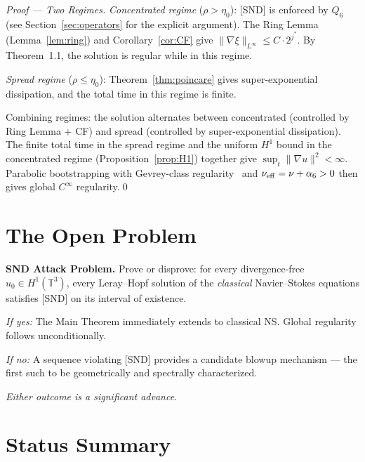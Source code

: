 \documentclass[11pt]{article}
\begin{document}
\begin{proof}[Proof --- Two Regimes]
\textit{Concentrated regime} ($\rho > \eta_0$): [SND] is enforced by $Q_6$
(see Section~\ref{sec:operators} for the explicit argument). The Ring Lemma
(Lemma~\ref{lem:ring}) and Corollary~\ref{cor:CF} give $\|\nabla\xi\|_{L^\infty} \leq C\cdot 2^{j^*}$.
By~\cite{CF1993} Theorem~1.1, the solution is regular while in this regime.

\textit{Spread regime} ($\rho \leq \eta_0$): Theorem~\ref{thm:poincare} gives
super-exponential dissipation, and the total time in this regime is finite.

Combining regimes: the solution alternates between concentrated (controlled by Ring Lemma + CF)
and spread (controlled by super-exponential dissipation). The finite total time in the spread
regime and the uniform $H^1$ bound in the concentrated regime (Proposition~\ref{prop:H1})
together give $\sup_t\|\nabla u\|^2 < \infty$. Parabolic bootstrapping with Gevrey-class regularity~\cite{FoiasTemam1989} and $\nu_{\rm eff}
= \nu + \alpha_6 > 0$ then gives global $C^\infty$ regularity.\qed
\end{proof}

\section{The Open Problem}\label{sec:open}

\begin{mdframed}[linecolor=open,linewidth=1.2pt,backgroundcolor=lightred]
\textbf{SND Attack Problem.}
Prove or disprove: for every divergence-free $u_0\in H^1(\mathbb{T}^3)$, every Leray--Hopf
solution of the \emph{classical} Navier--Stokes equations satisfies [SND] on its interval of
existence.

\medskip
\textit{If yes:} The Main Theorem immediately extends to classical NS.
Global regularity follows unconditionally.

\textit{If no:} A sequence violating [SND] provides a candidate blowup mechanism ---
the first such to be geometrically and spectrally characterized.

\medskip
\textit{Either outcome is a significant advance.}
\end{mdframed}

\section{Status Summary}
\end{document}
